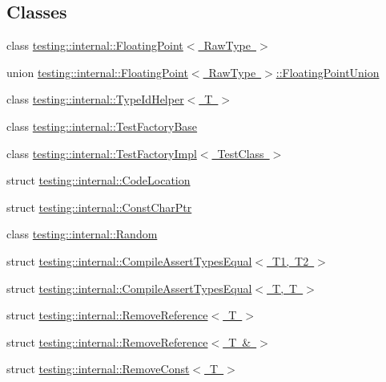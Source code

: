 \subsection*{Classes}
\begin{DoxyCompactItemize}
\item 
class \mbox{\hyperlink{classtesting_1_1internal_1_1_floating_point}{testing\+::internal\+::\+Floating\+Point$<$ Raw\+Type $>$}}
\item 
union \mbox{\hyperlink{uniontesting_1_1internal_1_1_floating_point_1_1_floating_point_union}{testing\+::internal\+::\+Floating\+Point$<$ Raw\+Type $>$\+::\+Floating\+Point\+Union}}
\item 
class \mbox{\hyperlink{classtesting_1_1internal_1_1_type_id_helper}{testing\+::internal\+::\+Type\+Id\+Helper$<$ T $>$}}
\item 
class \mbox{\hyperlink{classtesting_1_1internal_1_1_test_factory_base}{testing\+::internal\+::\+Test\+Factory\+Base}}
\item 
class \mbox{\hyperlink{classtesting_1_1internal_1_1_test_factory_impl}{testing\+::internal\+::\+Test\+Factory\+Impl$<$ Test\+Class $>$}}
\item 
struct \mbox{\hyperlink{structtesting_1_1internal_1_1_code_location}{testing\+::internal\+::\+Code\+Location}}
\item 
struct \mbox{\hyperlink{structtesting_1_1internal_1_1_const_char_ptr}{testing\+::internal\+::\+Const\+Char\+Ptr}}
\item 
class \mbox{\hyperlink{classtesting_1_1internal_1_1_random}{testing\+::internal\+::\+Random}}
\item 
struct \mbox{\hyperlink{structtesting_1_1internal_1_1_compile_assert_types_equal}{testing\+::internal\+::\+Compile\+Assert\+Types\+Equal$<$ T1, T2 $>$}}
\item 
struct \mbox{\hyperlink{structtesting_1_1internal_1_1_compile_assert_types_equal_3_01_t_00_01_t_01_4}{testing\+::internal\+::\+Compile\+Assert\+Types\+Equal$<$ T, T $>$}}
\item 
struct \mbox{\hyperlink{structtesting_1_1internal_1_1_remove_reference}{testing\+::internal\+::\+Remove\+Reference$<$ T $>$}}
\item 
struct \mbox{\hyperlink{structtesting_1_1internal_1_1_remove_reference_3_01_t_01_6_01_4}{testing\+::internal\+::\+Remove\+Reference$<$ T \& $>$}}
\item 
struct \mbox{\hyperlink{structtesting_1_1internal_1_1_remove_const}{testing\+::internal\+::\+Remove\+Const$<$ T $>$}}
\item 

\end{DoxyCompactItemize}
